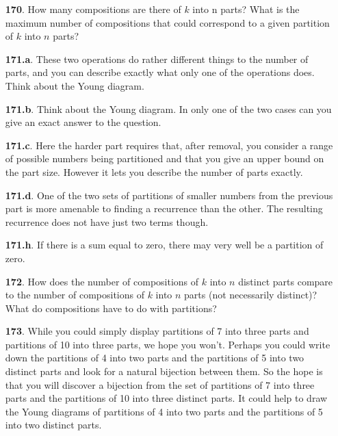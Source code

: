 \documentclass[10pt,]{book}
\theoremstyle{plain}
\theoremstyle{definition}
\theoremstyle{definition}
\numberwithin{equation}{chapter}
\begin{document}
\begin{itemize}[itemsep=1em]
\item[\textbf{170}.]\hypertarget{p-947}{}%
How many compositions are there of \(k\) into n parts? What is the maximum number of compositions that could correspond to a given partition of \(k\) into \(n\) parts?%

\item[\textbf{171.a}.]\hypertarget{p-952}{}%
These two operations do rather different things to the number of parts, and you can describe exactly what only one of the operations does. Think about the Young diagram.%

\item[\textbf{171.b}.]\hypertarget{p-955}{}%
Think about the Young diagram. In only one of the two cases can you give an exact answer to the question.%

\item[\textbf{171.c}.]\hypertarget{p-958}{}%
Here the harder part requires that, after removal, you consider a range of possible numbers being partitioned and that you give an upper bound on the part size. However it lets you describe the number of parts exactly.%

\item[\textbf{171.d}.]\hypertarget{p-962}{}%
One of the two sets of partitions of smaller numbers from the previous part is more amenable to finding a recurrence than the other. The resulting recurrence does not have just two terms though.%

\item[\textbf{171.h}.]\hypertarget{p-970}{}%
If there is a sum equal to zero, there may very well be a partition of zero.%

\item[\textbf{172}.]\hypertarget{p-976}{}%
How does the number of compositions of \(k\) into \(n\) distinct parts compare to the number of compositions of \(k\) into \(n\) parts (not necessarily distinct)? What do compositions have to do with partitions?%

\item[\textbf{173}.]\hypertarget{p-979}{}%
While you could simply display partitions of 7 into three parts and partitions of 10 into three parts, we hope you won't. Perhaps you could write down the partitions of 4 into two parts and the partitions of 5 into two distinct parts and look for a natural bijection between them. So the hope is that you will discover a bijection from the set of partitions of 7 into three parts and the partitions of 10 into three distinct parts. It could help to draw the Young diagrams of partitions of 4 into two parts and the partitions of 5 into two distinct parts.%


\end{itemize}
\end{document}
